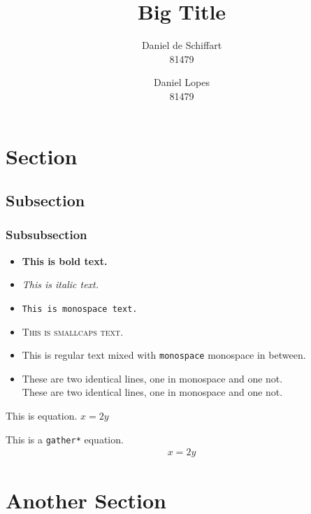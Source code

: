 \documentclass{ist-report}
\begin{document}
\title{Big Title}
\author{Daniel de Schiffart \\ 81479 \and Daniel Lopes \\ 81479}
\makecover

\section{Section}

\lipsum[1]

\subsection{Subsection}

\lipsum[1-2]

\subsubsection{Subsubsection}

\begin{itemize}
	\item \textbf{This is bold text.}
	\item \textit{This is italic text.}
	\item \texttt{This is monospace text.}
	\item \textsc{This is smallcaps text.}
	\item This is regular text mixed with \texttt{monospace} monospace in between.
	\item These are two identical lines, one in monospace and one not. \\ {\ttfamily These are two identical lines, one in monospace and one not.}
\end{itemize}

This is equation. $x = 2y$

This is a \texttt{gather*} equation.
\begin{gather*}
	x = 2y
\end{gather*}

\section{Another Section}

\lipsum[1-3]
\end{document}
